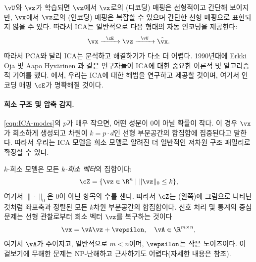 \documentclass[../../book-main_ko.tex]{subfiles}
\begin{document}
\(\vU\)와 \(\vz\)가 학습되면 \(\vz\)에서 \(\vx\)로의 (디코딩) 매핑은 선형적이고 간단해 보이지만, \(\vx\)에서 \(\vz\)로의 (인코딩) 매핑은 복잡할 수 있으며 간단한 선형 매핑으로 표현되지 않을 수 있다. 따라서 ICA는 일반적으로 다음 형태의 자동 인코딩을 제공한다:
\begin{equation}
    \vx   \xrightarrow{\hspace{2mm} \cE\hspace{2mm}} \vz  \xrightarrow{\hspace{2mm} \vU \hspace{2mm}} \hat{\vx}.
       \label{eqn:auto-encoding-ICA}
\end{equation}
따라서 PCA와 달리 ICA는 분석하고 해결하기가 다소 더 어렵다. 1990년대에 Erkki Oja 및 Aapo Hyv\"{a}rinen \cite{hyvarinen-1997,Hyvrinen-2000}과 같은 연구자들이 ICA에 대한 중요한 이론적 및 알고리즘적 기여를 했다. 에서, 우리는 ICA에 대한 해법을 연구하고 제공할 것이며, 여기서 인코딩 매핑 \(\cE\)가 명확해질 것이다.


\paragraph{희소 구조 및 압축 감지.}
\eqref{eqn:ICA-modes}의 \(p\)가 매우 작으면, 어떤 성분이 0이 아닐 확률이 작다. 이 경우 \(\vx\)가 희소하게 생성되고 차원이 \(k = p \cdot d\)인 선형 부분공간의 합집합에 집중된다고 말한다. 따라서 우리는 ICA 모델을 희소 모델로 알려진 더 일반적인 저차원 구조 패밀리로 확장할 수 있다.

\(k\)-희소 모델은 모든 \textit{\(k\)-희소 벡터}의 집합이다:
\begin{equation}
    \cZ = \{\vz \in \R^{n} \mid \|\vz\|_{0} \leq k\},
\end{equation}
여기서 \(\|\cdot\|_{0}\)은 0이 아닌 항목의 수를 센다. 따라서 \(\cZ\)는  (왼쪽)에 그림으로 나타난 것처럼 좌표축과 정렬된 모든 \(k\)차원 부분공간의 합집합이다. 신호 처리 및 통계의 중심 문제는 선형 관찰로부터 희소 벡터 \(\vz\)를 복구하는 것이다
\begin{equation}
    \vx = \vA \vz + \vepsilon, \quad \vA \in \R^{m\times n},
    \label{eqn:sparse-model}
\end{equation}
여기서 \(\vA\)가 주어지고, 일반적으로 \(m < n\)이며, \(\vepsilon\)는 작은 노이즈이다. 이 겉보기에 무해한 문제는 NP-난해하고 근사하기도 어렵다(자세한 내용은 \cite{Wright-Ma-2022} 참조).
\end{document}
